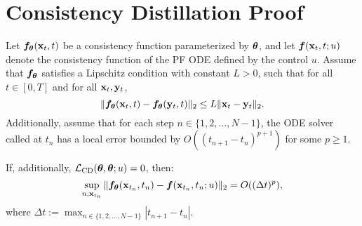 \section{Consistency Distillation Proof}\label{sec:a-proof}
\renewcommand{\thetheorem}{4.\arabic{theorem}} 
\begin{theorem}
    Let ${\bm{f}}_{\bm{\theta}}({\mathbf{x}}_t, t)$ be a consistency function parameterized by ${\bm{\theta}}$, and let ${\bm{f}}({\mathbf{x}}_t, t; u)$ denote the consistency function of the PF ODE defined by the control $u$. 
    Assume that ${\bm{f}}_{\bm{\theta}}$ satisfies a Lipschitz condition with constant $L > 0$, such that for all $t \in [0, T]$ and for all ${\mathbf{x}}_t, {\mathbf{y}}_t$,
    $$
        \| {\bm{f}}_{\bm{\theta}}({\mathbf{x}}_t, t) - {\bm{f}}_{\bm{\theta}}({\mathbf{y}}_t, t)\|_2 \leq L \|{\mathbf{x}}_t - {\mathbf{y}}_t\|_2.
    $$
    Additionally, assume that for each step $n \in \{1, 2, \ldots, N-1\}$, the ODE solver called at $t_{n}$ has a local error bounded by $O((t_{n+1} - t_n)^{p+1})$ for some $p \geq 1$.
    
    If, additionally, $\mathcal{L}_\text{CD}({\bm{\theta}}, {\bm{\theta}}; u) = 0$, then:
    $$
    \sup_{n,{\mathbf{x}}_{t_n}} \|{\bm{f}}_{\bm{\theta}}({\mathbf{x}}_{t_n}, t_n) -  {\bm{f}}({\mathbf{x}}_{t_n}, t_n; u)\|_2 = O((\Delta t)^p),
    $$
    where $\Delta t := \max_{n \in \{1, 2, \ldots, N-1\}} |t_{n+1} - t_n|$.
\end{theorem}
